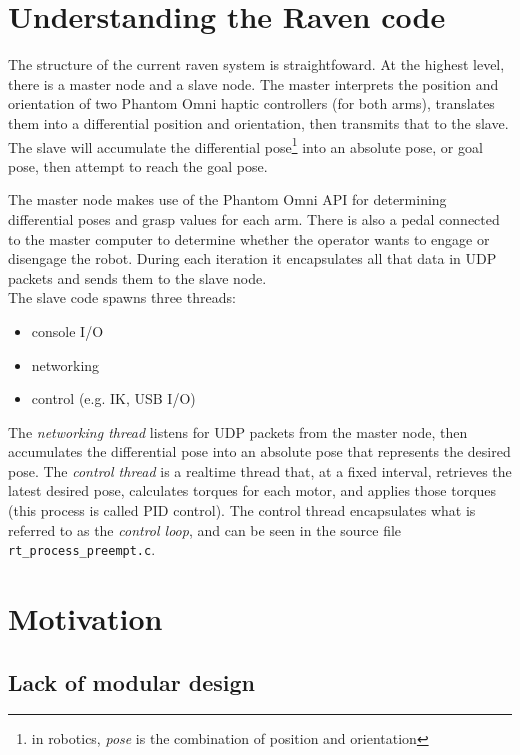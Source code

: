 \documentclass[letterpaper,twocolumn,10pt]{article}
\begin{document}
\section{Understanding the Raven code}

The structure of the current raven system is straightfoward. At the
highest level, there is a master node and a slave node. The master
interprets the position and orientation of two Phantom Omni haptic
controllers (for both arms), translates them into a differential
position and orientation, then transmits that to the slave. The slave
will accumulate the differential pose\footnote{in robotics, \emph{pose}
  is the combination of position and orientation} into an absolute
pose, or goal pose, then attempt to reach the goal pose.

The master node makes use of the Phantom Omni API for determining
differential poses and grasp values for each arm. There is also a
pedal connected to the master computer to determine whether the
operator wants to engage or disengage the robot. During each iteration
it encapsulates all that data in UDP packets and sends them to the
slave node. \\

\noindent
The slave code spawns three threads:

\begin{itemize}
  \item console I/O
  \item networking
  \item control (e.g. IK, USB I/O)
\end{itemize}

The \emph{networking thread} listens for UDP packets from the master
node, then accumulates the differential pose into an absolute pose
that represents the desired pose. The \emph{control thread} is a
realtime thread that, at a fixed interval, retrieves the latest
desired pose, calculates torques for each motor, and applies those
torques (this process is called PID control). The control thread
encapsulates what is referred to as the \emph{control loop}, and can
be seen in the source file \texttt{rt\_process\_preempt.c}.

\section{Motivation}

\subsection{Lack of modular design}
\end{document}
